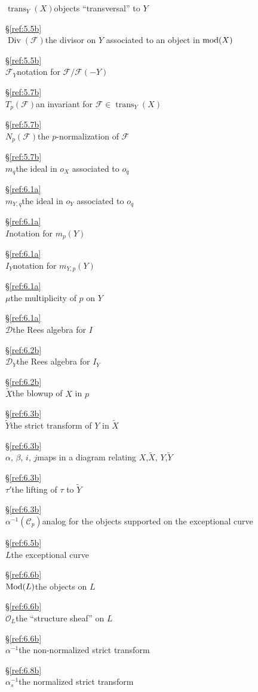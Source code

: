 \documentclass{amsproc}
\def\Cscr{{\mathcal C}}
\def\Dscr{{\mathcal D}}
\def\Fscr{{\mathcal F}}
\def\Oscr{{\mathcal O}}
\def\Mod{\mathop{\text{Mod}}}
\def\mod{\mathop{\text{mod}}}
\def\trans{\operatorname{trans}}
\def\Div{\operatorname{Div}}
\let\oldtext\text
\def\text#1{\oldtext{\upshape #1}}
\theoremstyle{definition}
\theoremstyle{remark}
\numberwithin{equation}{section}
\numberwithin{table}{section}
\numberwithin{figure}{section}
\begin{document}
\begin{tabbing}
$\trans_Y(X)$\>objects ``transversal'' to $Y$
\>\strut\hfill\S\ref{ref:5.5b}\>\\
$\Div(\Fscr)$\>the divisor on $Y$ associated to an object in $\mod(X)$
\>\strut\hfill\S\ref{ref:5.5b}\>\\
$\Fscr_Y$\>notation for $\Fscr/\Fscr(-Y)$
\>\strut\hfill\S\ref{ref:5.7b}\>\\
$T_p(\Fscr)$\>an invariant for $\Fscr\in\trans_Y(X)$
\>\strut\hfill\S\ref{ref:5.7b}\>\\
$N_p(\Fscr)$\>the $p$-normalization of $\Fscr$
\>\strut\hfill\S\ref{ref:5.7b}\>\\
$m_q$\>the ideal in $o_X$ associated to $o_q$
\>\strut\hfill\S\ref{ref:6.1a}\>\\
$m_{Y,q}$\>the ideal in $o_Y$ associated to $o_q$
\>\strut\hfill\S\ref{ref:6.1a}\>\\
$I$\>notation for $m_p(Y)$
\>\strut\hfill\S\ref{ref:6.1a}\>\\
$I_Y$\>notation for $m_{Y,p}(Y)$
\>\strut\hfill\S\ref{ref:6.1a}\>\\
$\mu$\>the multiplicity of $p$ on $Y$
\>\strut\hfill\S\ref{ref:6.1a}\>\\
$\Dscr$\>the Rees algebra for $I$
\>\strut\hfill\S\ref{ref:6.2b}\>\\
$\Dscr_Y$\>the Rees algebra for $I_Y$
\>\strut\hfill\S\ref{ref:6.2b}\>\\
$\tilde{X}$\>the blowup of $X$ in $p$
\>\strut\hfill\S\ref{ref:6.3b}\>\\
$\tilde{Y}$\>the strict transform of $Y$ in $\tilde{X}$
\>\strut\hfill\S\ref{ref:6.3b}\>\\ 
$\alpha$, $\beta$, $i$, $j$\>maps in a diagram relating
$X$,$\tilde{X}$, $Y$,$\tilde{Y}$ 
\>\strut\hfill\S\ref{ref:6.3b}\>\\ 
$\tau'$\>the lifting of $\tau$ to $\tilde{Y}$
\>\strut\hfill\S\ref{ref:6.3b}\>\\ 
$\alpha^{-1}(\Cscr_p)$\>analog for the objects supported on the
exceptional curve
\>\strut\hfill\S\ref{ref:6.5b}\>\\ 
$L$\>the exceptional curve 
\>\strut\hfill\S\ref{ref:6.6b}\>\\ 
$\Mod(L)$\>the objects on $L$
\>\strut\hfill\S\ref{ref:6.6b}\>\\ 
$\Oscr_L$\>the ``structure sheaf'' on $L$
\>\strut\hfill\S\ref{ref:6.6b}\>\\ 
$\alpha^{-1}$\>the non-normalized strict transform
\>\strut\hfill\S\ref{ref:6.8b}\>\\
$\alpha_s^{-1}$\>the normalized strict transform

\end{tabbing}
\end{document}
